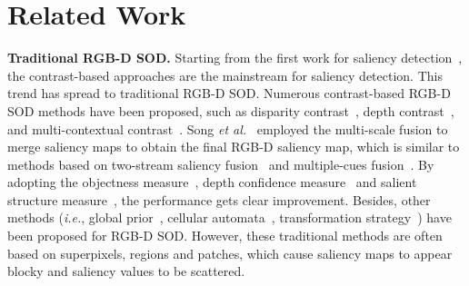 \documentclass[runningheads]{llncs}
\newcommand{\ie}{\emph{i.e.}}
\newcommand{\etal}{\emph{et al.}}
\begin{document}
\section{Related Work}

\noindent\textbf{Traditional RGB-D SOD.}
Starting from the first work for saliency detection~\cite{1998Itti},
the contrast-based approaches are the mainstream for saliency detection.
This trend has spread to traditional RGB-D SOD.
Numerous contrast-based RGB-D SOD methods have been proposed,
such as disparity contrast~\cite{Niu2012STEREO},
depth contrast~\cite{Fang2014TIP,Cheng2014DES,Fan2014DSP,SHK2015Saliency},
and multi-contextual contrast~\cite{Peng2014NLPR}.
Song \etal~\cite{Song2017MDSF} employed the multi-scale fusion
to merge saliency maps to obtain the final RGB-D saliency map, which is
similar to methods based on two-stream saliency fusion~\cite{Peng2014NLPR}
and multiple-cues fusion~\cite{Guo2015Salient,2017MBD}.
By adopting the objectness measure~\cite{Li2014LFSD},
depth confidence measure~\cite{Cong2016SPL} and
salient structure measure~\cite{Feng2016LBE}, the performance gets clear improvement.
Besides, other methods (\ie,
global prior~\cite{Ren2015CVPRW}, cellular automata~\cite{Guo2016ICME},
transformation strategy~\cite{Cong2019DTM})
have been proposed for RGB-D SOD.
However, these traditional methods are often based on superpixels,
regions and patches, which cause saliency maps to appear blocky
and saliency values to be scattered.
\end{document}

